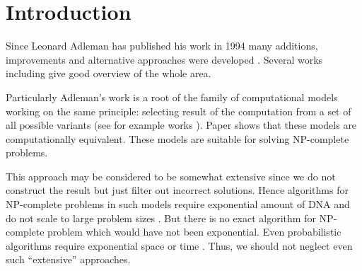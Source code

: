 \section{Introduction}

Since Leonard Adleman has published his work \cite{Adleman:1994} in 1994 many additions, improvements and alternative approaches were developed \cite{Lipton:1994, Amos:2002, Rozenberg:knapsack, Dantsin:2003, Paun:2002}. Several works including \cite{Amos:2002, Amos:2003:Book, PaunRozenbergSalomaa:1998} give good overview of the whole area.

Particularly Adleman's work is a root of the family of computational models working on the same principle: selecting result of the computation from a set of all possible variants (see for example works \cite{Amos:1996, Adleman:1996,  Liu:1996, Rozenberg:2003}). Paper \cite{Katsanyi:2003} shows that these models are computationally equivalent. These models are suitable for solving NP-complete problems.

This approach may be considered to be somewhat extensive since we do not construct the result but just filter out incorrect solutions. Hence algorithms for NP-complete problems in such models require exponential amount of DNA and do not scale to large problem sizes \cite{Hartmanis:1995}. But there is no exact algorithm for NP-complete problem which would have not been exponential. Even probabilistic algorithms require exponential space or time \cite{Liu:2005}. Thus, we should not neglect even such ``extensive'' approaches.

